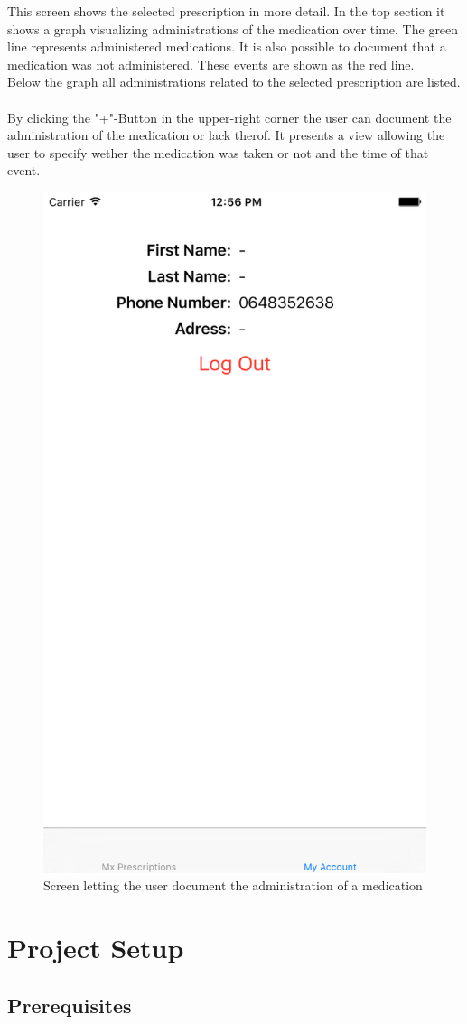 \documentclass{article}
\begin{document}
This screen shows the selected prescription in more detail.
In the top section it shows a graph visualizing administrations of the medication over time.
The green line represents administered medications.
It is also possible to document that a medication was not administered.
These events are shown as the red line.
\\
Below the graph all administrations related to the selected prescription are listed.
\\
\\
By clicking the "+"-Button in the upper-right corner the user can document the administration of the medication or lack therof.
It presents a view allowing the user to specify wether the medication was taken or not and the time of that event.
\\
\begin{figure}[H]
\centering
\includegraphics[width=0.5\linewidth, frame]{resources/app-screens/04-administration.png}
\caption{Screen letting the user document the administration of a medication}
\label{fig:app_screen:administration}
\end{figure}


\section{Project Setup}\label{step1}
\subsection{Prerequisites}\label{step1:prerequisites}
\end{document}
